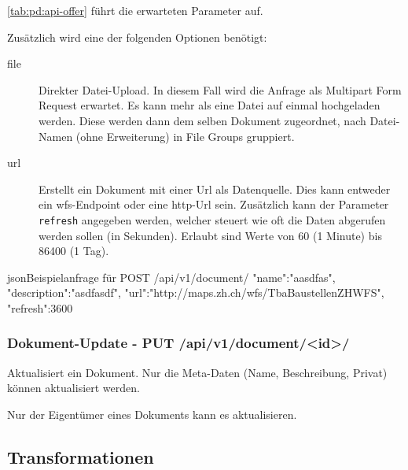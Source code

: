 \cref{tab:pd:api-offer} führt die erwarteten Parameter auf.

Zusätzlich wird eine der folgenden Optionen benötigt:
\begin{description}
\item[file] Direkter Datei-Upload. In diesem Fall wird die Anfrage als Multipart Form Request erwartet. Es kann mehr als eine Datei auf einmal hochgeladen werden. Diese werden dann dem selben Dokument zugeordnet, nach Datei-Namen (ohne Erweiterung) in File Groups gruppiert.
\item[url] Erstellt ein Dokument mit einer Url als Datenquelle. Dies kann entweder ein \gls{wfs}-Endpoint oder eine http-Url sein. Zusätzlich kann der Parameter \texttt{refresh} angegeben werden, welcher steuert wie oft die Daten abgerufen werden sollen (in Sekunden). Erlaubt sind Werte von 60 (1 Minute) bis 86400 (1 Tag).
\end{description}

\begin{srclst}{json}{Beispielanfrage für POST /api/v1/document/}
{
  "name":"aasdfas",
  "description":"asdfasdf",
  "url":"http://maps.zh.ch/wfs/TbaBaustellenZHWFS",
  "refresh":3600
}
\end{srclst}

\subsubsection{Dokument-Update - PUT /api/v1/document/<id>/}
Aktualisiert ein Dokument. Nur die Meta-Daten (Name, Beschreibung, Privat) können aktualisiert werden.

Nur der Eigentümer eines Dokuments kann es aktualisieren.

\subsection{Transformationen}
